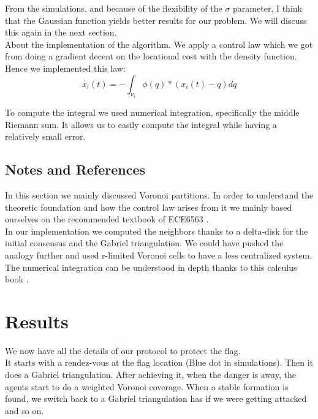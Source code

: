 \documentclass[journal]{IEEEtran}
\begin{document}
From the simulations, and because of the flexibility of the $\sigma$ parameter, I think that the Gaussian function yields better results for our problem. We will discuss this again in the next section.\\

About the implementation of the algorithm. We apply a control law which we got from doing a gradient decent on the locational cost with the density function. Hence we implemented this law:
\begin{equation}
\dot{x_i}(t) = - \int_{\nu_i} \phi(q)*(x_i(t) - q) dq \label{eq4}
\end{equation}

To compute the integral we used numerical integration, specifically the middle Riemann sum. It allows us to easily compute the integral while having a relatively small error.

\subsection{Notes and References}

In this section we mainly discussed Voronoi partitions. In order to understand the theoretic foundation and how the control law arises from it we mainly based ourselves on the recommended textbook of ECE6563 \cite{b2}.\\

In our implementation we computed the neighbors thanks to a delta-disk for the initial consensus and the Gabriel triangulation. We could have pushed the analogy further and used r-limited Voronoi cells \cite{b3} to have a less centralized system.\\  

The numerical integration can be understood in depth thanks to this calculus book \cite{b4}.

\section{Results}

We now have all the details of our protocol to protect the flag.\\

It starts with a rendez-vous at the flag location (Blue dot in simulations). Then it does a Gabriel triangulation. After achieving it, when the danger is away, the agents start to do a weighted Voronoi coverage. When a stable formation is found, we switch back to a Gabriel triangulation has if we were getting attacked and so on.\\
\end{document}
